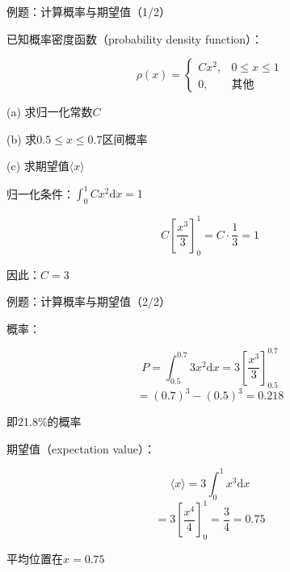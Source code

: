 \documentclass[aspectratio=169,11pt]{beamer}
\begin{document}
\begin{frame}{例题：计算概率与期望值（1/2）}

  \begin{iqbitemize}
  \item 已知概率密度函数（probability density function）：
  \end{iqbitemize}
    \[
      \rho(x) = \begin{cases}
        Cx^2, & 0 \leq x \leq 1 \\
        0, & \text{其他}
      \end{cases}
    \]
  \begin{iqbitemize}
    \item (a) 求归一化常数$C$
    \item (b) 求$0.5 \leq x \leq 0.7$区间概率
    \item (c) 求期望值$\langle x \rangle$
  \end{iqbitemize}
  \iqbtinysep

  \begin{iqbitemize}
  \item 归一化条件：$\int_0^1 Cx^2 \mathrm{d}x = 1$
  \end{iqbitemize}
    \[
      C \left[ \dfrac{x^3}{3} \right]_0^1 = C \cdot \dfrac{1}{3} = 1
    \]
  \begin{iqbitemize}
  \item 因此：$\boxed{C = 3}$
  \end{iqbitemize}
\end{frame}

\begin{frame}{例题：计算概率与期望值（2/2）}

  \begin{iqbitemize}
  \item 概率：
  \end{iqbitemize}
    \[
      P = \int_{0.5}^{0.7} 3x^2 \mathrm{d}x = 3\left[ \dfrac{x^3}{3} \right]_{0.5}^{0.7}
    \]
    \[
      = (0.7)^3 - (0.5)^3 = \boxed{0.218}
    \]
  \begin{iqbitemize}
  \item 即21.8\%的概率
  \end{iqbitemize}
  \iqbtinysep

  \begin{iqbitemize}
  \item 期望值（expectation value）：
  \end{iqbitemize}
    \[
      \langle x \rangle = 3\int_0^1 x^3 \mathrm{d}x
    \]
    \[
      = 3\left[ \dfrac{x^4}{4} \right]_0^1 = \dfrac{3}{4} = \boxed{0.75}
    \]
  \begin{iqbitemize}
  \item 平均位置在$x = 0.75$
  \end{iqbitemize}
\end{frame}
\end{document}

